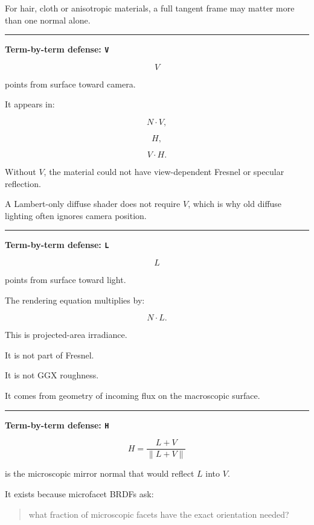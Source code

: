 For hair, cloth or anisotropic materials, a full tangent frame may matter more than one normal alone.

\begin{center}\rule{0.5\linewidth}{0.5pt}\end{center}

\textbf{Term-by-term defense: \texttt{V}}

\[
V
\]

points from surface toward camera.

It appears in:

\[
N\cdot V,
\]

\[
H,
\]

\[
V\cdot H.
\]

Without \(V\), the material could not have view-dependent Fresnel or specular reflection.

A Lambert-only diffuse shader does not require \(V\), which is why old diffuse lighting often ignores camera position.

\begin{center}\rule{0.5\linewidth}{0.5pt}\end{center}

\textbf{Term-by-term defense: \texttt{L}}

\[
L
\]

points from surface toward light.

The rendering equation multiplies by:

\[
N\cdot L.
\]

This is projected-area irradiance.

It is not part of Fresnel.

It is not GGX roughness.

It comes from geometry of incoming flux on the macroscopic surface.

\begin{center}\rule{0.5\linewidth}{0.5pt}\end{center}

\textbf{Term-by-term defense: \texttt{H}}

\[
H=
\frac{L+V}{\|L+V\|}
\]

is the microscopic mirror normal that would reflect \(L\) into \(V\).

It exists because microfacet BRDFs ask:

\begin{quote}
what fraction of microscopic facets have the exact orientation needed?
\end{quote}

